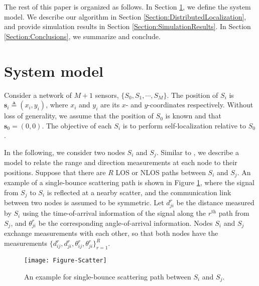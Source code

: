 \documentclass[10pt, twocolumn, final]{IEEEtran}
\begin{document}
The rest of this paper is organized as follows. In Section \ref{Section:System}, we define the system model. We describe our algorithm in Section \ref{Section:DistributedLocalization}, and provide simulation results in Section \ref{Section:SimulationResults}. In Section \ref{Section:Conclusions}, we summarize and conclude.

\section{System model}\label{Section:System}
Consider a network of $M+1$ sensors, $\{S_0, S_1, \cdots, S_M\}$. The position of $S_i$ is $\mathbf{s}_i \triangleq (x_i, y_i)$, where $x_i$ and $y_i$ are its $x$- and $y$-coordinates respectively. Without loss of generality, we assume that the position of $S_0$ is known and that $\mathbf{s}_0 = (0,0)$. The objective of each $S_i$ is to perform self-localization relative to $S_0$.

In the following, we consider two nodes $S_i$ and $S_j$. Similar to \cite{Seow2008}, we describe a model to relate the range and direction measurements at each node to their positions. Suppose that there are $R$ LOS or NLOS paths between $S_i$ and $S_j$. An example of a single-bounce scattering path is shown in Figure \ref{Figure-Scatter}, where the signal from $S_j$ to $S_i$ is reflected at a nearby scatter, and the communication link between two nodes is assumed to be symmetric. Let $d_{ji}^{r}$ be the distance measured by $S_i$ using the time-of-arrival information of the signal along the $r^{\textrm{th}}$ path from $S_j$, and $\theta_{ji}^r$ be the corresponding angle-of-arrival information. Nodes $S_i$ and $S_j$ exchange measurements with each other, so that both nodes have the measurements $\{d_{ij}^{r}, d_{ji}^{r}, \theta_{ij}^{r}, \theta_{ji}^{r}\}_{r = 1}^{R}$.

\begin{figure}[!t]
\centering
\texttt{[image: Figure-Scatter]}
\caption{An example for single-bounce scattering path between $S_i$ and $S_j$.} \label{Figure-Scatter}
\end{figure}
\end{document}
